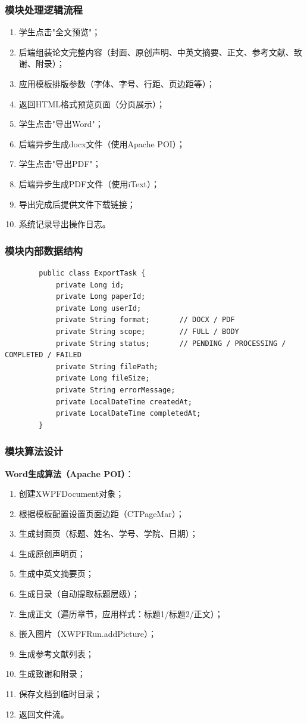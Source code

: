 \documentclass{../template/softeng}
\begin{document}
	\subsubsection{模块处理逻辑流程}
	\begin{enumerate}
		\item 学生点击"全文预览"；
		\item 后端组装论文完整内容（封面、原创声明、中英文摘要、正文、参考文献、致谢、附录）；
		\item 应用模板排版参数（字体、字号、行距、页边距等）；
		\item 返回HTML格式预览页面（分页展示）；
		\item 学生点击"导出Word"；
		\item 后端异步生成docx文件（使用Apache POI）；
		\item 学生点击"导出PDF"；
		\item 后端异步生成PDF文件（使用iText）；
		\item 导出完成后提供文件下载链接；
		\item 系统记录导出操作日志。
	\end{enumerate}

	\subsubsection{模块内部数据结构}
	\begin{verbatim}
		public class ExportTask {
			private Long id;
			private Long paperId;
			private Long userId;
			private String format;       // DOCX / PDF
			private String scope;        // FULL / BODY
			private String status;       // PENDING / PROCESSING / COMPLETED / FAILED
			private String filePath;
			private Long fileSize;
			private String errorMessage;
			private LocalDateTime createdAt;
			private LocalDateTime completedAt;
		}
	\end{verbatim}

	\subsubsection{模块算法设计}
	\textbf{Word生成算法（Apache POI）}：
	\begin{enumerate}
		\item 创建XWPFDocument对象；
		\item 根据模板配置设置页面边距（CTPageMar）；
		\item 生成封面页（标题、姓名、学号、学院、日期）；
		\item 生成原创声明页；
		\item 生成中英文摘要页；
		\item 生成目录（自动提取标题层级）；
		\item 生成正文（遍历章节，应用样式：标题1/标题2/正文）；
		\item 嵌入图片（XWPFRun.addPicture）；
		\item 生成参考文献列表；
		\item 生成致谢和附录；
		\item 保存文档到临时目录；
		\item 返回文件流。
	\end{enumerate}
\end{document}
